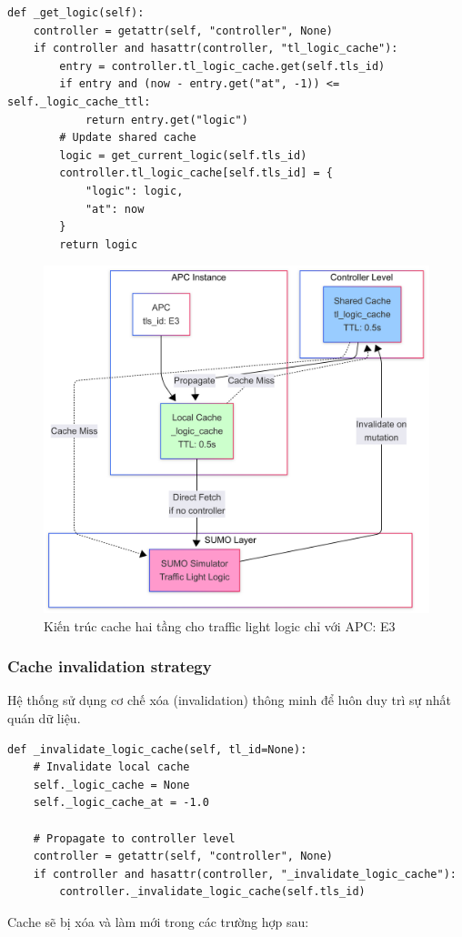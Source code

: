 \begin{lstlisting}[style=py, caption={Shared cache mechanism (chỉ với tls\_id: E3)}]
def _get_logic(self):
    controller = getattr(self, "controller", None)
    if controller and hasattr(controller, "tl_logic_cache"):
        entry = controller.tl_logic_cache.get(self.tls_id)
        if entry and (now - entry.get("at", -1)) <= self._logic_cache_ttl:
            return entry.get("logic")
        # Update shared cache
        logic = get_current_logic(self.tls_id)
        controller.tl_logic_cache[self.tls_id] = {
            "logic": logic, 
            "at": now
        }
        return logic
\end{lstlisting}

\vspace{1cm}

\begin{figure}[H]
    \centering
    \includegraphics[width=0.85\linewidth]{Untitled diagram _ Mermaid Chart-2025-08-22-044929.png}
    \caption{Kiến trúc cache hai tầng cho traffic light logic chỉ với APC: E3}
    \label{fig:cache_architecture}
\end{figure}

\subsubsection{Cache invalidation strategy}

Hệ thống sử dụng cơ chế xóa (invalidation) thông minh để luôn duy trì sự nhất quán dữ liệu.

\begin{lstlisting}[style=py, caption={Cache invalidation mechanism}]
def _invalidate_logic_cache(self, tl_id=None):
    # Invalidate local cache
    self._logic_cache = None
    self._logic_cache_at = -1.0
    
    # Propagate to controller level
    controller = getattr(self, "controller", None)
    if controller and hasattr(controller, "_invalidate_logic_cache"):
        controller._invalidate_logic_cache(self.tls_id)
\end{lstlisting}
Cache sẽ bị xóa và làm mới trong các trường hợp sau:

